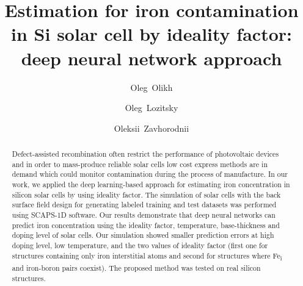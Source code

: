 \documentclass[num-refs]{wiley-article} %
\title{Estimation for iron contamination in Si solar cell by ideality factor: deep neural network approach}
\author[1]{Oleg~Olikh}
\author[1]{Oleg~Lozitsky}
\author[1]{Oleksii~Zavhorodnii}
\affil[1]{Taras Shevchenko National University of Kyiv, 64/13, Volodymyrska Street, Kyiv, 01601, Ukraine}
\begin{document}
\begin{frontmatter}
\maketitle

\begin{abstract}
Defect-assisted recombination often restrict the performance of photovoltaic devices
and in order to mass-produce reliable solar cells low cost express methods are in demand
which could monitor contamination during the process of manufacture.
In our work, we applied the deep learning-based approach for estimating iron concentration
in silicon solar cells by using ideality factor.
The simulation of solar cells with the back surface field design
for generating labeled training and test datasets was performed using SCAPS-1D software.
Our results demonstrate that deep neural networks can predict iron concentration using
the ideality factor, temperature, base-thickness and doping level of  solar cells.
Our simulation showed  smaller prediction errors at high doping level,
low temperature, and the two values of ideality factor
(first one for structures containing only iron interstitial atoms
and second for structures where Fe\textsubscript{i} and iron-boron pairs coexist).
The proposed method was tested on real silicon structures.

\end{abstract}

\end{frontmatter}

\end{document}
